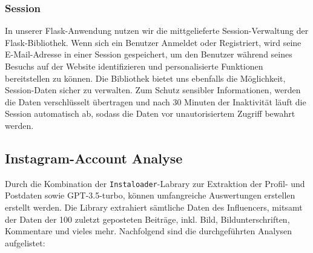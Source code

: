 \documentclass[conference,a4paper,flushend]{cs-techrep}
\begin{document}
\subsubsection{Session}
In unserer Flask-Anwendung nutzen wir die mittgelieferte Session-Verwaltung der Flask-Bibliothek. Wenn sich ein Benutzer Anmeldet oder Registriert, wird seine E-Mail-Adresse in einer Session gespeichert, um den Benutzer während seines Besuchs auf der Website identifizieren und personalisierte Funktionen bereitstellen zu können. Die Bibliothek bietet uns ebenfalls die Möglichkeit, Session-Daten sicher zu verwalten. Zum Schutz sensibler Informationen, werden die Daten verschlüsselt übertragen und nach 30 Minuten der Inaktivität läuft die Session automatisch ab, sodass die Daten vor unautorisiertem Zugriff bewahrt werden. 


\subsection{Instagram-Account Analyse}
Durch die Kombination der \texttt{Instaloader}-Labrary zur Extraktion der Profil- und Postdaten sowie GPT-3.5-turbo, können umfangreiche Auswertungen erstellen erstellt werden. Die Library extrahiert sämtliche Daten des Influencers, mitsamt der Daten der 100 zuletzt geposteten Beiträge, inkl. Bild, Bildunterschriften, Kommentare und vieles mehr. Nachfolgend sind die durchgeführten Analysen aufgelistet:
\end{document}
